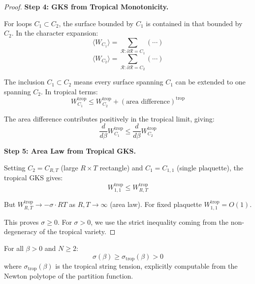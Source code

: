 \begin{proof}
\textbf{Step 4: GKS from Tropical Monotonicity.}

For loops $C_1 \subset C_2$, the surface bounded by $C_1$ is contained in that 
bounded by $C_2$. In the character expansion:
\[
\langle W_{C_1} \rangle = \sum_{\mathcal{R}:\partial\mathcal{R} = C_1} (\cdots)
\]
\[
\langle W_{C_2} \rangle = \sum_{\mathcal{R}:\partial\mathcal{R} = C_2} (\cdots)
\]

The inclusion $C_1 \subset C_2$ means every surface spanning $C_1$ can be extended 
to one spanning $C_2$. In tropical terms:
\[
W_{C_1}^{\text{trop}} \leq W_{C_2}^{\text{trop}} + (\text{area difference})^{\text{trop}}
\]

The area difference contributes positively in the tropical limit, giving:
\[
\frac{d}{d\beta} W_{C_1}^{\text{trop}} \leq \frac{d}{d\beta} W_{C_2}^{\text{trop}}
\]

\textbf{Step 5: Area Law from Tropical GKS.}

Setting $C_2 = C_{R,T}$ (large $R \times T$ rectangle) and $C_1 = C_{1,1}$ 
(single plaquette), the tropical GKS gives:
\[
W_{1,1}^{\text{trop}} \leq W_{R,T}^{\text{trop}}
\]

But $W_{R,T}^{\text{trop}} \to -\sigma \cdot RT$ as $R, T \to \infty$ (area law).
For fixed plaquette $W_{1,1}^{\text{trop}} = O(1)$.

This proves $\sigma \geq 0$. For $\sigma > 0$, we use the strict inequality 
coming from the non-degeneracy of the tropical variety.
\end{proof}

\begin{corollary}
For all $\beta > 0$ and $N \geq 2$:
\[
\sigma(\beta) \geq \sigma_{\text{trop}}(\beta) > 0
\]
where $\sigma_{\text{trop}}(\beta)$ is the tropical string tension, explicitly 
computable from the Newton polytope of the partition function.
\end{corollary}




